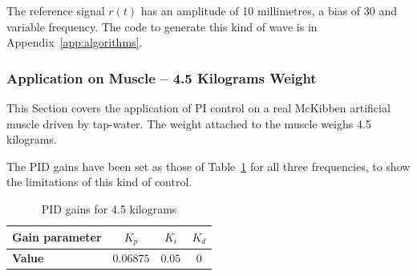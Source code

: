 The reference signal $r(t)$ has an amplitude of 10 millimetres, a bias of 30
and variable frequency. The code to generate this kind of wave
is in Appendix~\ref{app:algorithms}.

\subsubsection{Application on Muscle -- 4.5 Kilograms Weight}
\label{sec:6.4.5kg}

This Section covers the application of PI control on a real McKibben artificial muscle
driven by tap-water. The weight attached to the muscle weighs 4.5 kilograms.

The PID gains have been set as those of Table~\ref{tab:pid_gains_45}
for all three frequencies, to show the limitations of this kind of control.

\begin{table}[H]
	\centering
	\begin{tabular}{l c c c}
		\toprule
		\textbf{Gain parameter}	& $K_p$		& $K_i$		& $K_d$ \\ \midrule
		\textbf{Value}			& $0.06875$	& $0.05$	& $0$ \\ \bottomrule
	\end{tabular}
	\caption{PID gains for 4.5 kilograms}
	\label{tab:pid_gains_45}
\end{table}

